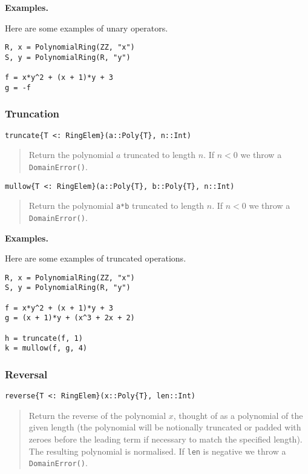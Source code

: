 \documentclass[a4paper,10pt]{article}
\newcommand{\code}{\lstinline}
\newcommand{\desc}[1]{\vspace{-3mm}\begin{quote}#1\end{quote}}
\begin{document}
\textbf{Examples.}

Here are some examples of unary operators.

\begin{lstlisting}
R, x = PolynomialRing(ZZ, "x")
S, y = PolynomialRing(R, "y")

f = x*y^2 + (x + 1)*y + 3
g = -f
\end{lstlisting}

\subsubsection{Truncation}

\begin{lstlisting}
truncate{T <: RingElem}(a::Poly{T}, n::Int)
\end{lstlisting}

\desc{Return the polynomial $a$ truncated to length $n$. If $n < 0$ we throw a
\code{DomainError()}.}

\begin{lstlisting}
mullow{T <: RingElem}(a::Poly{T}, b::Poly{T}, n::Int)
\end{lstlisting}

\desc{Return the polynomial \code{a*b} truncated to length $n$. If $n < 0$ we
throw a \code{DomainError()}.}

\textbf{Examples.}

Here are some examples of truncated operations.

\begin{lstlisting}
R, x = PolynomialRing(ZZ, "x")
S, y = PolynomialRing(R, "y")

f = x*y^2 + (x + 1)*y + 3
g = (x + 1)*y + (x^3 + 2x + 2)

h = truncate(f, 1)
k = mullow(f, g, 4)
\end{lstlisting}

\subsubsection{Reversal}

\begin{lstlisting}
reverse{T <: RingElem}(x::Poly{T}, len::Int)
\end{lstlisting}

\desc{Return the reverse of the polynomial $x$, thought of as a polynomial of
the given length (the polynomial will be notionally truncated or padded with
zeroes before the leading term if necessary to match the specified length). 
The resulting polynomial is normalised. If \code{len} is negative we throw a
\code{DomainError()}.}
\end{document}
